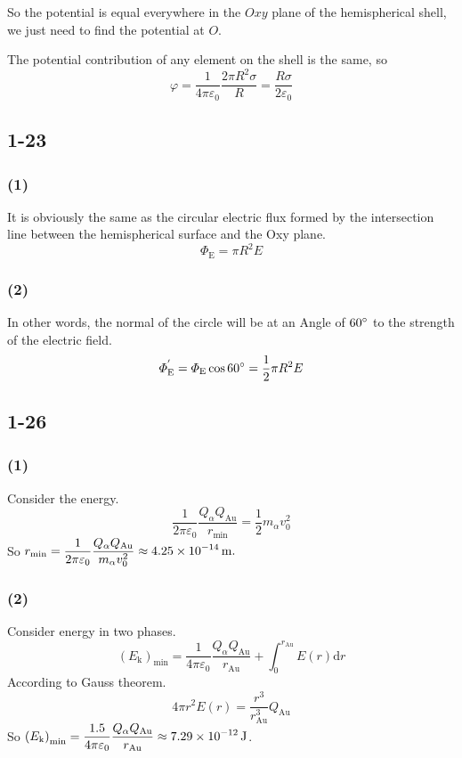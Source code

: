 \documentclass[a4paper,11pt]{amsart}
\theoremstyle{definition}
\begin{document}
	So the potential is equal everywhere in the $Oxy$ plane of the hemispherical shell, we just need to find the potential at $O$.
	
	The potential contribution of any element on the shell is the same, so
	\begin{equation*}
		\varphi =\frac{1}{4\pi \varepsilon _0}\frac{2\pi R^2\sigma}{R}=\frac{R\sigma}{2\varepsilon _0}
	\end{equation*}
	
	\subsection*{1-23}
	\subsubsection*{(1)}
	It is obviously the same as the circular electric flux formed by the intersection line between the hemispherical surface and the Oxy plane.
	$$
	\varPhi _{\mathrm{E}}=\pi R^2E
	$$
	\subsubsection*{(2)}
	In other words, the normal of the circle will be at an Angle of $60\degree$ to the strength of the electric field.
	$$
	\varPhi _{\mathrm{E}}^{'}=\varPhi _{\mathrm{E}}\cos 60\degree=\frac{1}{2}\pi R^2E
	$$
	
	
	
	\subsection*{1-26}
	\subsubsection*{(1)}
	Consider the energy.
	$$
	\frac{1}{2\pi\varepsilon_0}\frac{Q_\alpha Q_\mathrm{Au}}{r_\mathrm{min}}=\frac{1}{2}m_\alpha v_0^2
	$$
	So $\displaystyle r_\mathrm{min}=\frac{1}{2\pi \varepsilon _0}\frac{Q_{\alpha}Q_{\mathrm{Au}}}{m_{\alpha}v_{0}^{2}}\approx4.25\times10^{-14}\thinspace\mathrm{m}.$
	\subsubsection*{(2)}
	Consider energy in two phases.
	$$
	(E_\mathrm{k})_\mathrm{min}=\frac{1}{4\pi \varepsilon _0}\frac{Q_{\alpha}Q_{\mathrm{Au}}}{r_{\mathrm{Au}}}+\int_0^{r_{\mathrm{Au}}}{E\left( r \right) \mathrm{d}r}
	$$
	According to Gauss theorem.
	$$
	4\pi r^2E\left( r \right) =\frac{r^3}{r_{\mathrm{Au}}^{3}}Q_{\mathrm{Au}}
	$$
	So $\displaystyle\left( E_{\mathrm{k}} \right) _{\min}=\frac{1.5}{4\pi \varepsilon _0}\frac{Q_{\alpha}Q_{\mathrm{Au}}}{r_{\mathrm{Au}}}\approx7.29\times10^{-12}\thinspace\mathrm{J}$.
\end{document}
